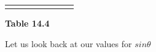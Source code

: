 \begin{center}
\begin{xtabular*}{\mytablewidth}[t]{|p{10\mystarwidth}|p{10\mystarwidth}|p{10\mystarwidth}|p{10\mystarwidth}|p{10\mystarwidth}|p{10\mystarwidth}|p{10\mystarwidth}|p{10\mystarwidth}|}
{    \addtocounter{footnote}{-0}
    
                }
     \tabularnewline{}
    \end{xtabular*}
      \end{center}
    \begin{center}{\small\bfseries Table 14.4}\end{center}
    
    \addtocounter{footnote}{-0}
    
    \par
  
        
        
        

        \label{m39414*id84056}Let us look back at our values for \begin{math}sin\theta \end{math}\par 
      
